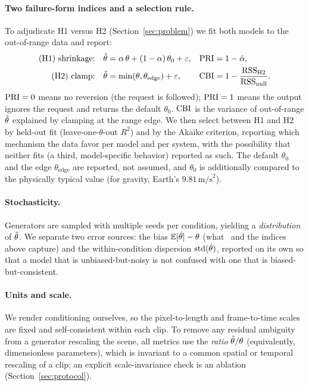 \paragraph{Two failure-form indices and a selection rule.}
To adjudicate H1 versus H2 (Section~\ref{sec:problem}) we fit both models to the
out-of-range data and report:
\begin{align}
\text{(H1) shrinkage:}\quad & \hat{\theta} = \alpha\,\theta + (1-\alpha)\,\theta_0 + \varepsilon,
   & \mathrm{PRI} &= 1-\hat\alpha, \label{eq:pri}\\
\text{(H2) clamp:}\quad & \hat{\theta} = \min(\theta,\theta_{\text{edge}}) + \varepsilon,
   & \mathrm{CBI} &= 1 - \frac{\mathrm{RSS}_{\text{H2}}}{\mathrm{RSS}_{\text{null}}}. \nonumber
\end{align}
$\mathrm{PRI}=0$ means no reversion (the request is followed); $\mathrm{PRI}=1$ means the
output ignores the request and returns the default $\theta_0$. $\mathrm{CBI}$ is the
variance of out-of-range $\hat{\theta}$ explained by clamping at the range edge.
We then select between H1 and H2 by held-out fit (leave-one-$\theta$-out $R^2$)
and by the Akaike criterion, reporting which mechanism the data favor per model
and per system, with the possibility that neither fits (a third, model-specific
behavior) reported as such. The default $\theta_0$ and the edge
$\theta_{\text{edge}}$ are reported, not assumed, and $\theta_0$ is additionally
compared to the physically typical value (for gravity, Earth's
$9.81\,\text{m/s}^2$).

\paragraph{Stochasticity.}
Generators are sampled with multiple seeds per condition, yielding a
\emph{distribution} of $\hat{\theta}$. We separate two error sources: the bias
$\mathbb{E}[\hat{\theta}]-\theta$ (what \PRE\ and the indices above capture) and the
within-condition dispersion $\mathrm{std}(\hat{\theta})$, reported on its own so that
a model that is unbiased-but-noisy is not confused with one that is
biased-but-consistent.

\paragraph{Units and scale.}
We render conditioning ourselves, so the pixel-to-length and frame-to-time
scales are fixed and self-consistent within each clip. To remove any residual
ambiguity from a generator rescaling the scene, all metrics use the
\emph{ratio} $\hat{\theta}/\theta$ (equivalently, dimensionless parameters), which is
invariant to a common spatial or temporal rescaling of a clip; an explicit
scale-invariance check is an ablation (Section~\ref{sec:protocol}).

